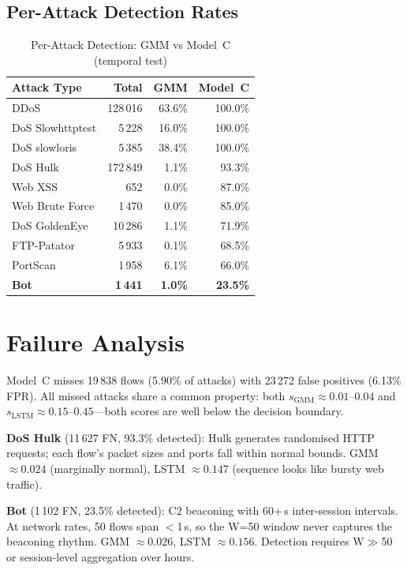 \documentclass[conference]{IEEEtran}
\begin{document}
\subsection{Per-Attack Detection Rates}

\begin{table}[h]
\centering
\caption{Per-Attack Detection: GMM vs Model~C (temporal test)}
\label{tab:per-attack}
\begin{tabular}{lrrr}
\toprule
Attack Type & Total & GMM & Model~C \\
\midrule
DDoS           & 128\,016 & 63.6\% & 100.0\% \\
DoS Slowhttptest &  5\,228 & 16.0\% & 100.0\% \\
DoS slowloris  &  5\,385 & 38.4\% & 100.0\% \\
DoS Hulk       & 172\,849 &  1.1\% &  93.3\% \\
Web XSS        &    652 &  0.0\% &  87.0\% \\
Web Brute Force &  1\,470 &  0.0\% &  85.0\% \\
DoS GoldenEye  & 10\,286 &  1.1\% &  71.9\% \\
FTP-Patator    &  5\,933 &  0.1\% &  68.5\% \\
PortScan       &  1\,958 &  6.1\% &  66.0\% \\
\textbf{Bot}   & \textbf{1\,441} & \textbf{1.0\%} & \textbf{23.5\%} \\
\bottomrule
\end{tabular}
\end{table}

\section{Failure Analysis}

Model~C misses 19\,838 flows (5.90\% of attacks) with 23\,272 false
positives (6.13\% FPR).  All missed attacks share a common property:
both $s_{\text{GMM}} \approx 0.01$--$0.04$ and $s_{\text{LSTM}} \approx
0.15$--$0.45$---both scores are well below the decision boundary.

\textbf{DoS Hulk} (11\,627 FN, 93.3\% detected): Hulk generates
randomised HTTP requests; each flow's packet sizes and ports fall within
normal bounds.  GMM $\approx 0.024$ (marginally normal), LSTM $\approx
0.147$ (sequence looks like bursty web traffic).

\textbf{Bot} (1\,102 FN, 23.5\% detected): C2 beaconing with 60+\,s
inter-session intervals.  At network rates, 50 flows span $<$1\,s, so
the W=50 window never captures the beaconing rhythm.  GMM $\approx 0.026$,
LSTM $\approx 0.156$.  Detection requires W$\gg$50 or session-level
aggregation over hours.
\end{document}
